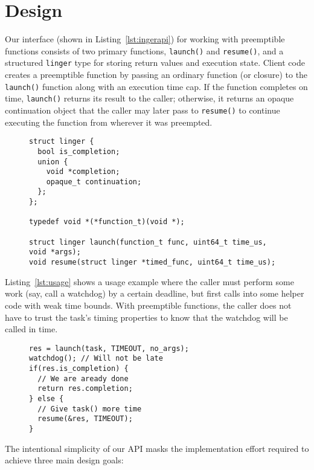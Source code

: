 \section{Design}

Our interface (shown in Listing~\ref{lst:ingerapi}) for working with
preemptible functions consists of two primary functions, \texttt{launch()} and
\texttt{resume()}, and a structured \texttt{linger} type for storing return values
and execution state.  Client code creates a preemptible function by passing an
ordinary function (or closure) to the \texttt{launch()} function along with an
execution time cap.  If the function completes on time,
\texttt{launch()} returns its result to the caller; otherwise, it returns an opaque
continuation object that the caller may later pass to \texttt{resume()} to continue
executing the function from wherever it was preempted.

\begin{figure}
\begin{lstlisting}[label=lst:ingerapi,caption=Preemptible functions C-language interface]
struct linger {
  bool is_completion;
  union {
    void *completion;
    opaque_t continuation;
  };
};

typedef void *(*function_t)(void *);

struct linger launch(function_t func, uint64_t time_us, void *args);
void resume(struct linger *timed_func, uint64_t time_us);
\end{lstlisting}
\end{figure}

Listing~\ref{lst:usage} shows a usage example where the caller must
perform some work (say, call a watchdog) by a certain deadline, but first
calls into some helper code with weak time bounds.  With preemptible functions,
the caller does not have to trust the task's timing properties to know that the
watchdog will be called
in time.

\begin{figure}
\begin{lstlisting}[label=lst:usage,caption=Preemptible function usage example]
res = launch(task, TIMEOUT, no_args);
watchdog(); // Will not be late
if(res.is_completion) {
  // We are aready done
  return res.completion;
} else {
  // Give task() more time
  resume(&res, TIMEOUT);
}
\end{lstlisting}
\end{figure}

The intentional simplicity of our API masks the implementation effort required to
achieve three main design goals:

